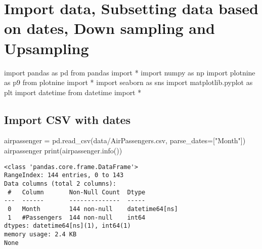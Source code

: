 \documentclass[
  letterpaper,
  DIV=11,
  numbers=noendperiod]{scrreprt}
\newenvironment{Shaded}{\begin{snugshade}}{\end{snugshade}}
\newcommand{\BuiltInTok}[1]{\textcolor[rgb]{0.00,0.23,0.31}{#1}}
\newcommand{\ImportTok}[1]{\textcolor[rgb]{0.00,0.46,0.62}{#1}}
\newcommand{\NormalTok}[1]{\textcolor[rgb]{0.00,0.23,0.31}{#1}}
\newcommand{\OperatorTok}[1]{\textcolor[rgb]{0.37,0.37,0.37}{#1}}
\newcommand{\StringTok}[1]{\textcolor[rgb]{0.13,0.47,0.30}{#1}}
\begin{document}
\begin{verbatim}
\end{verbatim}


\hypertarget{import-data-subsetting-data-based-on-dates-down-sampling-and-upsampling}{%
\chapter{Import data, Subsetting data based on dates, Down sampling and
Upsampling}\label{import-data-subsetting-data-based-on-dates-down-sampling-and-upsampling}}

\begin{Shaded}
\begin{Highlighting}[]
\ImportTok{import}\NormalTok{ pandas }\ImportTok{as}\NormalTok{ pd}
\ImportTok{from}\NormalTok{ pandas }\ImportTok{import} \OperatorTok{*}
\ImportTok{import}\NormalTok{ numpy }\ImportTok{as}\NormalTok{ np}
\ImportTok{import}\NormalTok{ plotnine }\ImportTok{as}\NormalTok{ p9}
\ImportTok{from}\NormalTok{ plotnine }\ImportTok{import} \OperatorTok{*}
\ImportTok{import}\NormalTok{ seaborn }\ImportTok{as}\NormalTok{ sns}
\ImportTok{import}\NormalTok{ matplotlib.pyplot }\ImportTok{as}\NormalTok{ plt}
\ImportTok{import}\NormalTok{ datetime}
\ImportTok{from}\NormalTok{ datetime }\ImportTok{import} \OperatorTok{*}
\end{Highlighting}
\end{Shaded}

\hypertarget{import-csv-with-dates}{%
\section{Import CSV with dates}\label{import-csv-with-dates}}

\begin{Shaded}
\begin{Highlighting}[]
\NormalTok{airpassenger }\OperatorTok{=}\NormalTok{ pd.read\_csv(}\StringTok{\textquotesingle{}data/AirPassengers.csv\textquotesingle{}}\NormalTok{, parse\_dates}\OperatorTok{=}\NormalTok{[}\StringTok{"Month"}\NormalTok{])}
\NormalTok{airpassenger}
\BuiltInTok{print}\NormalTok{(airpassenger.info())}
\end{Highlighting}
\end{Shaded}

\begin{verbatim}
<class 'pandas.core.frame.DataFrame'>
RangeIndex: 144 entries, 0 to 143
Data columns (total 2 columns):
 #   Column       Non-Null Count  Dtype         
---  ------       --------------  -----         
 0   Month        144 non-null    datetime64[ns]
 1   #Passengers  144 non-null    int64         
dtypes: datetime64[ns](1), int64(1)
memory usage: 2.4 KB
None
\end{verbatim}
\end{document}
